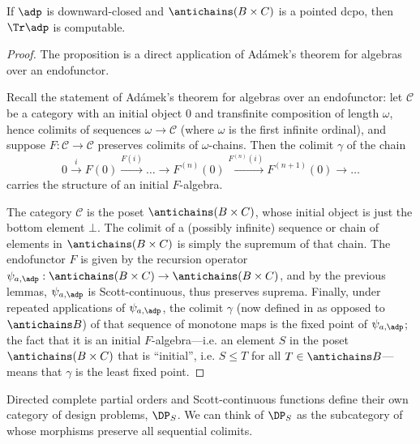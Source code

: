 

\begin{proposition}
If $\adp$ is downward-closed and $\antichains (B \times C)$ is a pointed dcpo, then $\Tr \adp$ is computable.
\end{proposition}

\begin{proof}
The proposition is a direct application of Ad\'amek's theorem for algebras over an endofunctor.

Recall the statement of Ad\'amek's theorem for algebras over an endofunctor: let $\mathcal{C}$ be a category with an initial object $0$ and transfinite composition of length $\omega$, hence colimits of sequences $\omega \to \mathcal{C}$ (where $\omega$ is the first infinite ordinal), and suppose $F: \mathcal{C} \to \mathcal{C}$ preserves colimits of $\omega$-chains. Then the colimit $\gamma$ of the chain \[0 \overset{i}{\to} F(0) \overset{F(i)}{\to} \ldots \to F^{(n)}(0) \overset{F^{(n)}(i)}{\to} F^{(n+1)}(0) \to \ldots\] carries the structure of an initial $F$-algebra.

The category $\mathcal{C}$ is the poset $\antichains (B \times C)$, whose initial object is just the bottom element $\bot$. The colimit of a (possibly infinite) sequence or chain of elements in $\antichains (B\times C)$ is simply the supremum of that chain. The endofunctor $F$ is given by the recursion operator $\psi_{a,\adp} : \antichains (B\times C) \to \antichains (B\times C)$, and by the previous lemmas, $\psi_{a,\adp}$ is Scott-continuous, thus preserves suprema. Finally, under repeated applications of $\psi_{a,\adp}$, the colimit $\gamma$ (now defined in \Pos as opposed to $\antichains B$) of that sequence of monotone maps is the fixed point of $\psi_{a,\adp}$; the fact that it is an initial $F$-algebra---i.e. an element $S$ in the poset $\antichains (B\times C)$ that is ``initial'', i.e. $S \leq T$ for all $T \in \antichains B$---means that $\gamma$ is the least fixed point.
\end{proof}


Directed complete partial orders and Scott-continuous functions define their own category of design problems, $\DP_S$. We can think of $\DP_S$ as the subcategory of \DP whose morphisms preserve all sequential colimits.




